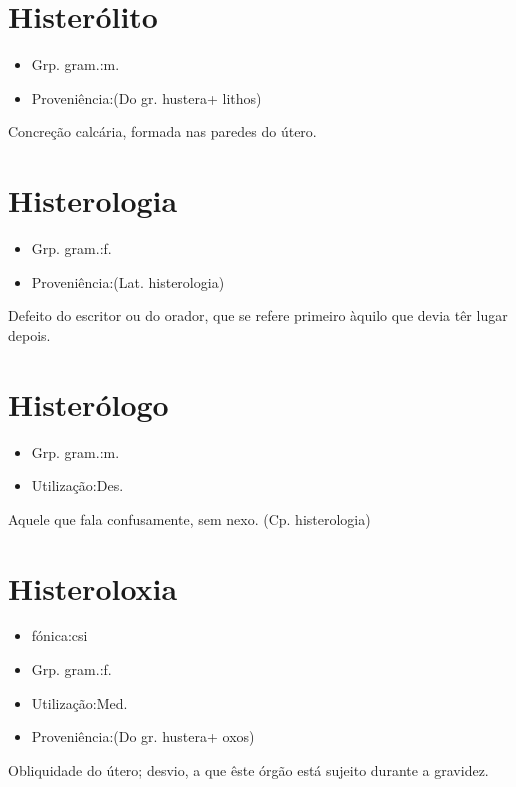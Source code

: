 \documentclass{article}
\begin{document}
\section{Histerólito}
\begin{itemize}
\item {Grp. gram.:m.}
\end{itemize}
\begin{itemize}
\item {Proveniência:(Do gr. \textunderscore hustera\textunderscore  + \textunderscore lithos\textunderscore )}
\end{itemize}
Concreção calcária, formada nas paredes do útero.
\section{Histerologia}
\begin{itemize}
\item {Grp. gram.:f.}
\end{itemize}
\begin{itemize}
\item {Proveniência:(Lat. \textunderscore histerologia\textunderscore )}
\end{itemize}
Defeito do escritor ou do orador, que se refere primeiro àquilo que devia têr lugar depois.
\section{Histerólogo}
\begin{itemize}
\item {Grp. gram.:m.}
\end{itemize}
\begin{itemize}
\item {Utilização:Des.}
\end{itemize}
Aquele que fala confusamente, sem nexo.
(Cp. \textunderscore histerologia\textunderscore )
\section{Histeroloxia}
\begin{itemize}
\item {fónica:csi}
\end{itemize}
\begin{itemize}
\item {Grp. gram.:f.}
\end{itemize}
\begin{itemize}
\item {Utilização:Med.}
\end{itemize}
\begin{itemize}
\item {Proveniência:(Do gr. \textunderscore hustera\textunderscore  + \textunderscore oxos\textunderscore )}
\end{itemize}
Obliquidade do útero; desvio, a que êste órgão está sujeito durante a gravidez.
\end{document}

